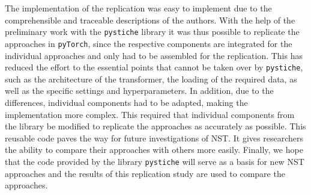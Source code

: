 The implementation of the replication was easy to implement due to the comprehensible and traceable descriptions of the authors. With the help of the preliminary work with the \texttt{pystiche} library it was thus possible to replicate the approaches in \texttt{pyTorch}, since the respective components are integrated for the individual approaches and only had to be assembled for the replication. This has reduced the effort to the essential points that cannot be taken over by \texttt{pystiche}, such as the architecture of the transformer, the loading of the required data, as well as the specific settings and hyperparameters. In addition, due to the differences, individual components had to be adapted, making the implementation more complex. This required that individual components from the library be modified to replicate the approaches as accurately as possible. This reusable code paves the way for future investigations of \gls{NST}. It gives researchers the ability to compare their approaches with others more easily. Finally, we hope that the code provided by the library \texttt{pystiche} will serve as a basis for new  \gls{NST} approaches and the results of this replication study are used to compare the approaches.







